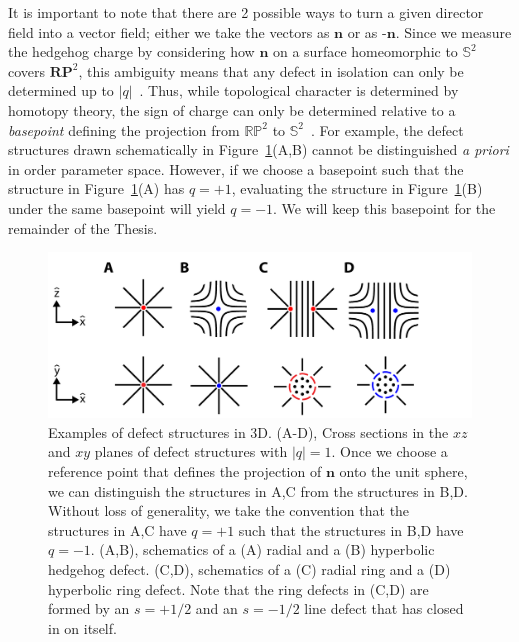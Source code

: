 It is important to note that there are 2 possible ways to turn a given director field into a vector field; either we take the vectors as $\mathbf{n}$ or as -$\mathbf{n}$.
Since we measure the hedgehog charge by considering how $\mathbf{n}$ on a surface homeomorphic to $\mathbb{S}^2$ covers $\mathbf{RP}^2$, this ambiguity means that any defect in isolation can only be determined up to $|q|$~\cite{RN153}.
Thus, while topological character is determined by homotopy theory, the sign of charge can only be determined relative to a \emph{basepoint} defining the projection from $\mathbb{R}\mathbb{P}^2$ to $\mathbb{S}^2$~\cite{RN153}.
For example, the defect structures drawn schematically in Figure~\ref{f:2-3DMeas}(A,B) cannot be distinguished \emph{a priori} in order parameter space.
However, if we choose a basepoint such that the structure in Figure~\ref{f:2-3DMeas}(A) has $q = +1$, evaluating the structure in Figure~\ref{f:2-3DMeas}(B) under the same basepoint will yield $q = -1$.
We will keep this basepoint for the remainder of the Thesis.
\begin{figure}[h]
  \centering
  \includegraphics{figures/C2/Ch2-Figs_3DMeas.png}
  \caption{Examples of defect structures in 3D.
  (A-D), Cross sections in the $xz$ and $xy$ planes of defect structures with $|q| = 1$.
  Once we choose a reference point that defines the projection of $\mathbf{n}$ onto the unit sphere, we can distinguish the structures in A,C from the structures in B,D.
  Without loss of generality, we take the convention that the structures in A,C have $q = +1$ such that the structures in B,D have $q = -1$.
  (A,B), schematics of a (A) radial and a (B) hyperbolic hedgehog defect.
  (C,D), schematics of a (C) radial ring and a (D) hyperbolic ring defect.
  Note that the ring defects in (C,D) are formed by an $s = +1/2 $ and an $s = -1/2$ line defect that has closed in on itself.}\label{f:2-3DMeas}
\end{figure}

